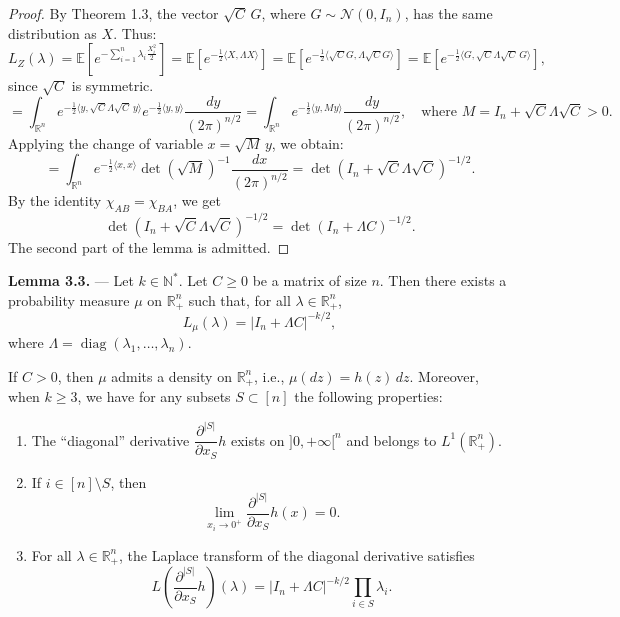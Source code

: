 \documentclass[12pt]{article}
\begin{document}
\begin{proof}
By Theorem 1.3, the vector $\sqrt{C}\, G$, where $G \sim \mathcal{N}(0, I_n)$, has the same distribution as $X$. Thus:
\[
L_Z(\lambda) = \mathbb{E} \left[ e^{-\sum_{i=1}^{n} \lambda_i \frac{X_i^2}{2}} \right]
= \mathbb{E} \left[ e^{-\frac{1}{2} \langle X, \Lambda X \rangle} \right]
= \mathbb{E} \left[ e^{-\frac{1}{2} \langle \sqrt{C} G, \Lambda \sqrt{C} G \rangle} \right]
= \mathbb{E} \left[ e^{-\frac{1}{2} \langle G, \sqrt{C} \Lambda \sqrt{C} \, G \rangle} \right],
\]
since $\sqrt{C}$ is symmetric.
\[
= \int_{\mathbb{R}^n} e^{-\frac{1}{2} \langle y, \sqrt{C} \Lambda \sqrt{C} \, y \rangle} e^{-\frac{1}{2} \langle y, y \rangle} \frac{dy}{(2\pi)^{n/2}}
= \int_{\mathbb{R}^n} e^{-\frac{1}{2} \langle y, M y \rangle} \frac{dy}{(2\pi)^{n/2}}, \quad \text{where } M = I_n + \sqrt{C} \Lambda \sqrt{C} > 0.
\]
Applying the change of variable $x = \sqrt{M}\, y$, we obtain:
\[
= \int_{\mathbb{R}^n} e^{-\frac{1}{2} \langle x, x \rangle} \det(\sqrt{M})^{-1} \frac{dx}{(2\pi)^{n/2}}
= \det(I_n + \sqrt{C} \Lambda \sqrt{C})^{-1/2}.
\]
By the identity $\chi_{AB} = \chi_{BA}$, we get
\[
\det(I_n + \sqrt{C} \Lambda \sqrt{C})^{-1/2} = \det(I_n + \Lambda C)^{-1/2}.
\]
The second part of the lemma is admitted.
\end{proof}

\newpage

\textbf{Lemma 3.3.} — Let $k \in \mathbb{N}^*$. Let $C \geq 0$ be a matrix of size $n$. Then there exists a probability measure $\mu$ on $\mathbb{R}_+^n$ such that, for all $\lambda \in \mathbb{R}_+^n$,
\[
L_\mu(\lambda) = |I_n + \Lambda C|^{-k/2},
\]
where $\Lambda = \operatorname{diag}(\lambda_1, \ldots, \lambda_n)$.

If $C > 0$, then $\mu$ admits a density on $\mathbb{R}_+^n$, i.e., $\mu(dz) = h(z) \, dz$. Moreover, when $k \geq 3$, we have for any subsets $S \subset [n]$ the following properties:
\begin{enumerate}
    \item The ``diagonal'' derivative $\dfrac{\partial^{|S|}}{\partial x_S} h$ exists on $]0, +\infty[^n$ and belongs to $L^1(\mathbb{R}_+^n)$.
    \item If $i \in [n] \setminus S$, then
    \[
    \lim_{x_i \to 0^+} \frac{\partial^{|S|}}{\partial x_S} h(x) = 0.
    \]
    \item For all $\lambda \in \mathbb{R}_+^n$, the Laplace transform of the diagonal derivative satisfies
    \[
    L\left( \frac{\partial^{|S|}}{\partial x_S} h \right)(\lambda) = |I_n + \Lambda C|^{-k/2} \prod_{i \in S} \lambda_i.
    \]
\end{enumerate}
\end{document}
